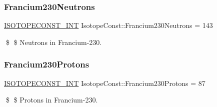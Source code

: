 \subsubsection{\texorpdfstring{Francium230\+Neutrons}{Francium230Neutrons}}
{\footnotesize\ttfamily \mbox{\hyperlink{group___isotope_const-_macros_ga5f18360b3e99483a35c32d789e62621c}{I\+S\+O\+T\+O\+P\+E\+C\+O\+N\+S\+T\+\_\+\+I\+NT}} Isotope\+Const\+::\+Francium230\+Neutrons = 143}

\$ \$ Neutrons in Francium-\/230. \mbox{\label{group___isotope_const-_francium-_fr230_gae80911aa6821b8aad854bc962ca8df99}} 
\subsubsection{\texorpdfstring{Francium230\+Protons}{Francium230Protons}}
{\footnotesize\ttfamily \mbox{\hyperlink{group___isotope_const-_macros_ga5f18360b3e99483a35c32d789e62621c}{I\+S\+O\+T\+O\+P\+E\+C\+O\+N\+S\+T\+\_\+\+I\+NT}} Isotope\+Const\+::\+Francium230\+Protons = 87}

\$ \$ Protons in Francium-\/230. 